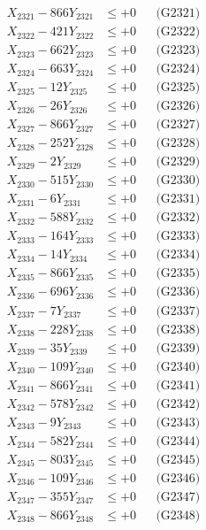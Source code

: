 \documentclass[a4paper,10pt]{article}
\begin{document}
{\begin{align}
\allowbreak
X_{2321} - 866Y_{2321} &\leq +0 && \text{(G2321)} \\
X_{2322} - 421Y_{2322} &\leq +0 && \text{(G2322)} \\
X_{2323} - 662Y_{2323} &\leq +0 && \text{(G2323)} \\
X_{2324} - 663Y_{2324} &\leq +0 && \text{(G2324)} \\
X_{2325} - 12Y_{2325} &\leq +0 && \text{(G2325)} \\
X_{2326} - 26Y_{2326} &\leq +0 && \text{(G2326)} \\
X_{2327} - 866Y_{2327} &\leq +0 && \text{(G2327)} \\
X_{2328} - 252Y_{2328} &\leq +0 && \text{(G2328)} \\
X_{2329} - 2Y_{2329} &\leq +0 && \text{(G2329)} \\
X_{2330} - 515Y_{2330} &\leq +0 && \text{(G2330)} \\
\allowbreak
X_{2331} - 6Y_{2331} &\leq +0 && \text{(G2331)} \\
X_{2332} - 588Y_{2332} &\leq +0 && \text{(G2332)} \\
X_{2333} - 164Y_{2333} &\leq +0 && \text{(G2333)} \\
X_{2334} - 14Y_{2334} &\leq +0 && \text{(G2334)} \\
X_{2335} - 866Y_{2335} &\leq +0 && \text{(G2335)} \\
X_{2336} - 696Y_{2336} &\leq +0 && \text{(G2336)} \\
X_{2337} - 7Y_{2337} &\leq +0 && \text{(G2337)} \\
X_{2338} - 228Y_{2338} &\leq +0 && \text{(G2338)} \\
X_{2339} - 35Y_{2339} &\leq +0 && \text{(G2339)} \\
X_{2340} - 109Y_{2340} &\leq +0 && \text{(G2340)} \\
\allowbreak
X_{2341} - 866Y_{2341} &\leq +0 && \text{(G2341)} \\
X_{2342} - 578Y_{2342} &\leq +0 && \text{(G2342)} \\
X_{2343} - 9Y_{2343} &\leq +0 && \text{(G2343)} \\
X_{2344} - 582Y_{2344} &\leq +0 && \text{(G2344)} \\
X_{2345} - 803Y_{2345} &\leq +0 && \text{(G2345)} \\
X_{2346} - 109Y_{2346} &\leq +0 && \text{(G2346)} \\
X_{2347} - 355Y_{2347} &\leq +0 && \text{(G2347)} \\
X_{2348} - 866Y_{2348} &\leq +0 && \text{(G2348)} \\

\end{align}}
\end{document}
